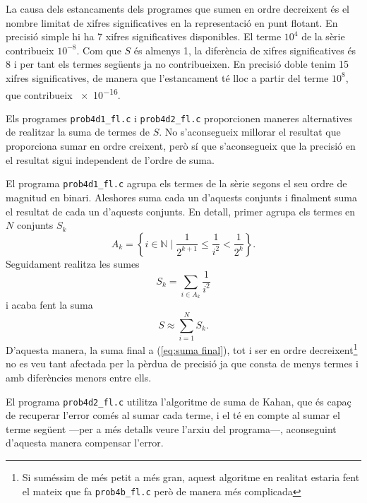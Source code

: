 \documentclass[12pt]{article}
\newcommand{\N}{\mathbb{N}}
\begin{document}
La causa dels estancaments dels programes que sumen en ordre decreixent és el nombre limitat de xifres significatives en la representació en punt flotant. En precisió simple hi ha 7 xifres significatives disponibles. El terme \( 10^4 \) de la sèrie contribueix \( 10^{-8} \). Com que \( S \) és almenys 1, la diferència de xifres significatives és 8 i per tant els termes següents ja no contribueixen. En precisió doble tenim 15 xifres significatives, de manera que l'estancament té lloc a partir del terme \( 10^8 \), que contribueix \num{e-16}.

Els programes \texttt{prob4d1\_fl.c} i \texttt{prob4d2\_fl.c} proporcionen maneres alternatives de realitzar la suma de termes de $S$. No s'aconsegueix millorar el resultat que proporciona sumar en ordre creixent, però sí que s'aconsegueix que la precisió en el resultat sigui independent de l'ordre de suma.

El programa \texttt{prob4d1\_fl.c} agrupa els termes de la sèrie segons el seu ordre de magnitud en binari. Aleshores suma cada un d'aquests conjunts i finalment suma el resultat de cada un d'aquests conjunts. En detall, primer agrupa els termes en \( N \) conjunts \( S_k \) 
\begin{equation*}
	A_k = \left\{i \in \N \; \big\vert \; \frac{1}{2^{k+1}}\leq\frac{1}{i^2}<\frac{1}{2^k} \right\}.
\end{equation*}
Seguidament realitza les sumes
\begin{equation*}
	S_k = \sum_{i \in A_k} \dfrac{1}{i^2}
\end{equation*}
i acaba fent la suma
\begin{equation}
	S \approx \sum_{i = 1}^N S_k. \label{eq:suma final}
\end{equation}
D'aquesta manera, la suma final a (\ref{eq:suma final}), tot i ser en ordre decreixent\footnote{Si suméssim de més petit a més gran, aquest algoritme en realitat estaria fent el mateix que fa \texttt{prob4b\_fl.c} però de manera més complicada} no es veu tant afectada per la pèrdua de precisió ja que consta de menys termes i amb diferències menors entre ells.

El programa \texttt{prob4d2\_fl.c} utilitza l'algoritme de suma de Kahan, que és capaç de recuperar l'error comés al sumar cada terme, i el té en compte al sumar el terme següent ---per a més detalls veure l'arxiu del programa---, aconseguint d'aquesta manera compensar l'error.
\end{document}
